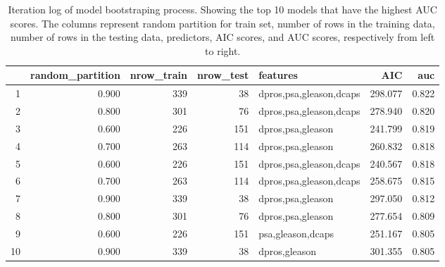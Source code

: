 \documentclass[11pt]{article}\usepackage[]{graphicx}\usepackage[]{color}
\begin{document}
\begin{center}
\begin{table}[ht]
\centering
\begin{tabular}{rrrrlrr}
  \hline
 & random\_partition & nrow\_train & nrow\_test & features & AIC & auc \\ 
  \hline
1 & 0.900 &  339 &   38 & dpros,psa,gleason,dcaps & 298.077 & 0.822 \\ 
  2 & 0.800 &  301 &   76 & dpros,psa,gleason,dcaps & 278.940 & 0.820 \\ 
  3 & 0.600 &  226 &  151 & dpros,psa,gleason & 241.799 & 0.819 \\ 
  4 & 0.700 &  263 &  114 & dpros,psa,gleason & 260.832 & 0.818 \\ 
  5 & 0.600 &  226 &  151 & dpros,psa,gleason,dcaps & 240.567 & 0.818 \\ 
  6 & 0.700 &  263 &  114 & dpros,psa,gleason,dcaps & 258.675 & 0.815 \\ 
  7 & 0.900 &  339 &   38 & dpros,psa,gleason & 297.050 & 0.812 \\ 
  8 & 0.800 &  301 &   76 & dpros,psa,gleason & 277.654 & 0.809 \\ 
  9 & 0.600 &  226 &  151 & psa,gleason,dcaps & 251.167 & 0.805 \\ 
  10 & 0.900 &  339 &   38 & dpros,gleason & 301.355 & 0.805 \\ 
   \hline
\end{tabular}
\caption{Iteration log of model bootstraping process. Showing the top 10 models that have the highest AUC scores. The columns represent random partition for train set, number of rows in the training data, number of rows in the testing data, predictors, AIC scores, and AUC scores, respectively from left to right.} 
\label{reg_bootstrap}
\end{table}

\end{center}
\end{document}
